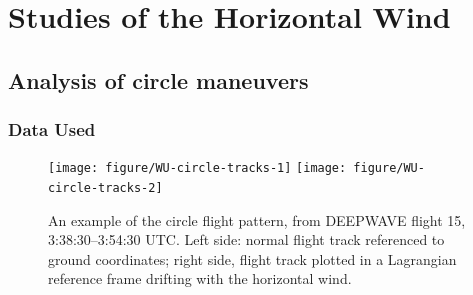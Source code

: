 \documentclass[12pt,twoside,english]{article}\usepackage[]{graphicx}\usepackage[]{color}
\newenvironment{knitrout}{}{} %
\let\stdsection\section
\renewcommand{\section}{\newpage\stdsection}
\begin{document}




\section{Studies of the Horizontal Wind\label{sec:HWind}}




\subsection{Analysis of circle maneuvers\label{sub:Analysis-of-circle}}

\subsubsection{Data Used}

\begin{knitrout}\footnotesize
{}\color{fgcolor}\begin{figure}

{\centering \texttt{[image: figure/WU-circle-tracks-1]} 
\texttt{[image: figure/WU-circle-tracks-2]} 

}

\caption[An example of the circle flight pattern.]{An example of the circle flight pattern, from DEEPWAVE flight 15, 3:38:30--3:54:30 UTC. Left side: normal flight track referenced to ground coordinates; right side, flight track plotted in a Lagrangian reference frame drifting with the horizontal wind.}\label{fig:circle-tracks}
\end{figure}


\end{knitrout}
\end{document}
